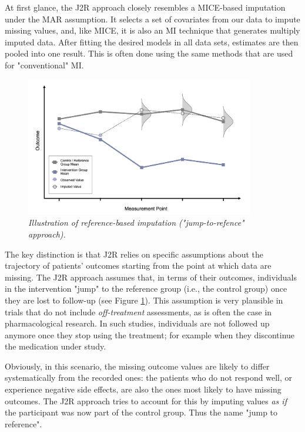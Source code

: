 At first glance, the J2R approach closely resembles a \textsf{MICE}-based imputation under the MAR assumption. It selects a set of covariates from our data to impute missing values, and, like \textsf{MICE}, it is also an MI technique that generates multiply imputed data. After fitting the desired models in all data sets, estimates are then pooled into one result. This is often \citep[but not always;][]{bartlett2020bootstrap, bartlett2023reference} done using the same methods that are used for "conventional" MI. 

\begin{figure}[H] 
\includegraphics[width=10cm]{images/j2r2.png}
\centering
\caption{\emph{Illustration of reference-based imputation ("jump-to-refence" approach).}}
\label{fig:j2r}
\end{figure}

 
The key distinction is that J2R relies on specific assumptions about the trajectory of patients' outcomes starting from the point at which data are missing. The J2R approach assumes that, in terms of their outcomes, individuals in the intervention "jump" to the reference group (i.e., the control group) once they are lost to follow-up (see Figure \ref{fig:j2r}). This assumption is very plausible in trials that do not include \emph{off-treatment} assessments, as is often the case in pharmacological research. In such studies, individuals are not followed up anymore once they stop using the treatment; for example when they discontinue the medication under study. 

Obviously, in this scenario, the missing outcome values are likely to differ systematically from the recorded ones: the patients who do not respond well, or experience negative side effects, are also the ones most likely to have missing outcomes. The J2R approach tries to account for this by imputing values \emph{as if} the participant was now part of the control group. Thus the name "jump to reference". 

